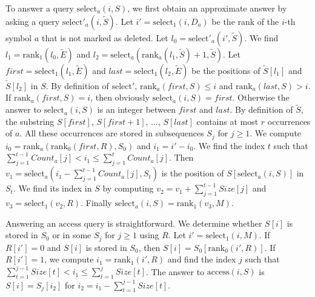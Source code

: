 \documentclass[11pt]{article}\usepackage{fullpage}
\def\idrm#1{\ensuremath{\mathrm{#1}}}
\newcommand{\tS}{{\tilde S}}
\newcommand{\tE}{{\tilde E}}
\newcommand{\ra}{\idrm{rank}}
\newcommand{\sel}{\idrm{select}}
\newcommand{\acc}{\idrm{access}}
\begin{document}
To answer a query $\sel_a(i,S)$, we first obtain an approximate answer by asking a query $\sel'_a(i,\tS)$. 
Let $i'=\sel_1(i,D_a)$ be the rank of the $i$-th symbol $a$ that is not marked as deleted. Let $l_0=\sel'_a(i',\tS)$. We find $l_1=\ra_1(l_0,\tE)$ and $l_2=\sel_a(\ra_a(l_1,\tS)+1,\tS)$. 
Let $first=\sel_1(l_1,\tE)$ and $last=\sel_1(l_2,\tE)$ be the positions of  $\tS[l_1]$ and $\tS[l_2]$ in $S$.
By definition of $\sel'$, $\ra_a(first,S)\le i$ and $\ra_a(last,S)> i$.  If $\ra_a(first,S)=i$, then obviously $\sel_a(i,S)=first$.
Otherwise the answer to $\sel_a(i,S)$ is an integer between $first$ and $last$.
By definition of $\tS$, the substring $S[first]$, $S[first+1]$, $\ldots$, $S[last]$ contains at most $r$ occurrences of $a$.
All these occurrences are stored in  subsequences $S_j$ for  $j\ge 1$.
We compute $i_0=\ra_a(\ra_0(first,R),S_0)$ and $i_1=i'-i_0$. We find the index $t$ 
such that $\sum_{j=1}^{t-1} Count_a[j]< i_1\le \sum_{j=1}^t Count_a[j]$.
Then $v_1=\sel_a(i_1- \sum_{j=1}^{t-1} Count_a[j], S_t)$ is the position of $S[\sel_a(i,S)]$ in $S_t$. We find its index in $S$ by computing  $v_2=v_1+\sum_{j=1}^{t-1}Size[j]$ and $v_3=\sel_1(v_2,R)$. Finally  $\sel_a(i,S)=\ra_1(v_3,M)$.




Answering an $\acc$ query is straightforward. We determine whether $S[i]$ is stored in $S_0$ or in some $S_j$ for $j\ge 1$ using $R$. Let $i'=\sel_1(i,M)$. If $R[i']=0$ and $S[i]$ is stored in $S_0$, then $S[i]=S_0[\ra_0(i',R)]$. If $R[i']=1$, we compute $i_1=\ra_1(i',R)$  and find the index $j$ such that 
$\sum_{t=1}^{j-1}Size[t] < i_1 \le \sum_{t=1}^j Size[t]$. The answer to $\acc(i,S)$ is $S[i]=S_j[i_2]$ for $i_2=i_1-\sum_{t=1}^{j-1}Size[t]$.
\end{document}
